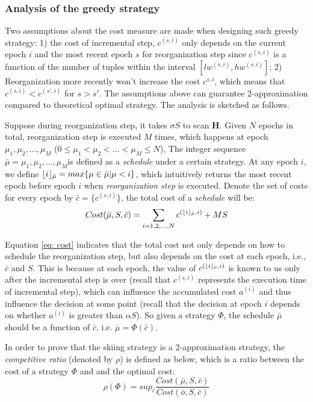 \subsubsection{Analysis of the greedy strategy}
Two assumptions about the cost measure are made when designing such greedy strategy: 1) the cost of incremental step, $c^{(s, i)}$ only depends on the current epoch $i$ and the most recent epoch $s$ for reorganization step since $c^{(s, i)}$ is a function of the number of tuples within the interval $[lw^{(s,i)}, hw^{(s,i)}]$; 2) Reorganization more recently won't increase the cost $c^{s,i}$, which means that $c^{(s, i)} < c^{(s',i)}$ for $s > s'$. The assumptions above can guarantee 2-approximation compared to theoretical optimal strategy. The analysis is sketched as follows.

Suppose during reorganization step, it takes $\sigma S$ to scan $\textbf{H}$. Given $N$ epochs in total, reorganization step is executed $M$ times, which happens at epoch $\mu_1, \mu_2,\dots, \mu_M$ ($0 \leq \mu_1 < \mu_2 < \dots < \mu_M \leq N$), The integer sequence $\bar{\mu} = \mu_1, \mu_2,\dots, \mu_M$is defined as a {\em schedule} under a certain strategy. At any epoch $i$, we define $\lfloor i\rfloor_{\bar{\mu}} = max\{\mu \in \bar{\mu} | \mu < i\}$, which intuitively returns the most recent epoch before epoch $i$ when {\em reorganization step} is executed. Denote the set of costs for every epoch by $\bar{c} = \{c^{(s,i)}\}$, the total cost of a {\em schedule} will be:
\begin{equation}\label{eq: cost}
    Cost(\bar{\mu}, S, \bar{c}) = \sum_{i=1,2,\dots,N}c^{(\lfloor i\rfloor_{\bar{\mu}}, i)} + MS
\end{equation}

Equation \ref{eq: cost} indicates that the total cost not only depends on how to schedule the reorganization step, but also depends on the cost at each epoch, i.e., $\bar{c}$ and $S$. This is because at each epoch, the value of $c^{(\lfloor i\rfloor_{\bar{\mu}}, i)}$ is known to us only after the incremental step is over (recall that $c^{(s,i)}$ represents the execution time of incremental step), which can influence the accumulated cost $a^{(i)}$ and thus influence the decision at some point (recall that the decision at epoch $i$ depends on whether $a^{(i)}$ is greater than $\alpha S$). So given a strategy $\Phi$, the schedule $\bar{\mu}$ should be a function of $\bar{c}$, i.e. $\bar{\mu} = \Phi(\bar{c})$.

In order to prove that the skiing strategy is a 2-approximation strategy, the {\em competitive ratio} (denoted by $\rho$) is defined as below, which is a ratio between the cost of a strategy $\Phi$ and and the optimal cost:
\begin{equation}
    \rho(\Phi) = sup_{\bar{c}}\frac{Cost(\bar{\mu}, S, \bar{c})}{Cost(\bar{o}, S, \bar{c})}
\end{equation}


